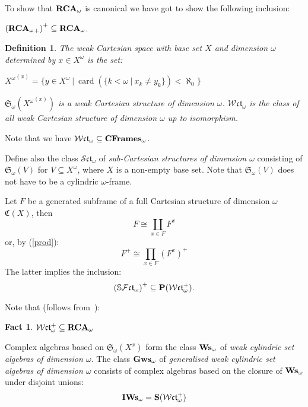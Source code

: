 \documentclass{article}
\theoremstyle{defin}
\newtheorem{definition}{Definition}
\theoremstyle{theorem}
\theoremstyle{claim}
\theoremstyle{prop}
\theoremstyle{lemma}
\theoremstyle{fact}
\newtheorem{fact}{Fact}
\theoremstyle{remark}
\theoremstyle{ex}
\theoremstyle{col}
\theoremstyle{question}
\begin{document}
To show that ${\bf RCA}_{\omega}$ is canonical we have got to show the following inclusion:

\begin{center}
${({{\bf RCA}_{\omega}}_{+})}^+ \subseteq {\bf RCA}_{\omega}$.
\end{center}


\begin{definition}
The weak Cartesian space with base set $X$ and dimension $\omega$ determined by $x \in X^{\omega}$ is the set:
\begin{center}
${X^{\omega}}^{(x)} = \{ y \in X^{\omega} \: | \: \operatorname{card}(\{ k < \omega \: | \: x_k \neq y_k \}) < \aleph_0 \}$
\end{center}
$\mathfrak{S}_{\omega}({X^{\omega}}^{(x)})$ is a weak Cartesian structure of dimension $\omega$. 
$\mathcal{W}\mathfrak{ct}_{\omega}$ is the class of all weak Cartesian structure of dimension $\omega$ up to isomorphism.
\end{definition}
Note that we have $\mathcal{W}\mathfrak{ct}_{\omega} \subseteq {\bf CFrames}_{\omega}$.

Define also the class $\mathcal{S}\mathfrak{ct}_{\omega}$ of \emph{sub-Cartesian structures of dimension $\omega$} 
consisting of $\mathfrak{S}_{\omega}(V)$ for $V \subseteq X^{\omega}$, 
where $X$ is a non-empty base set. 
Note that $\mathfrak{S}_{\omega}(V)$ does not have to be a cylindric $\omega$-frame.

Let $F$ be a generated subframe of a full Cartesian structure of dimension $\omega$ $\mathfrak{C}(X)$, then
\begin{equation}
F \cong \coprod \limits_{x \in F} F^x
\end{equation}
or, by (\ref{prod}):
\begin{equation}
F^{+} \cong \prod \limits_{x \in F} {(F^{x})}^{+}
\end{equation}
The latter implies the inclusion:
\begin{equation}
{(\mathbb{S} \mathcal{F}\mathfrak{ct}_{\omega})}^+ \subseteq {\bf P} (\mathcal{W}\mathfrak{ct}_{\omega}^{+}).
\end{equation}

Note that (follows from~\cite[p. 118]{henkin1981cylindric}):
\begin{fact}
$\mathcal{W}\mathfrak{ct}_{\omega}^+ \subseteq {\bf RCA}_{\omega}$
\end{fact}

Complex algebras based on $\mathfrak{S}_{\omega}(X^x)$ form the class ${\bf Ws}_{\omega}$ of \emph{weak cylindric set algebras of dimension $\omega$}. The class ${\bf Gws}_{\omega}$ of \emph{generalised weak cylindric set algebras of dimension $\omega$} consists of complex algebras based on the closure of ${\bf Ws}_{\omega}$ under disjoint unions:
\begin{equation}
{\bf IWs}_{\omega} = {\bf S} (\mathcal{W}\mathfrak{ct}_{\omega}^{+})
\end{equation}
\end{document}
